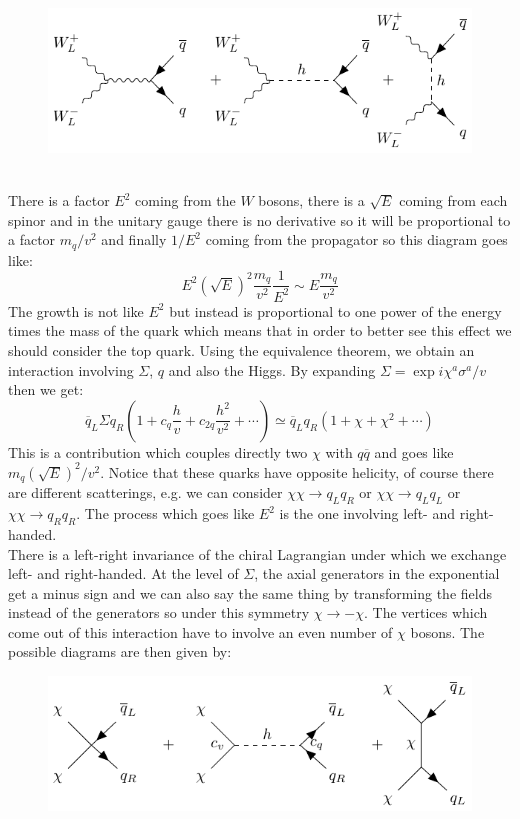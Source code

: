 \documentclass[../main.tex]{subfiles}
\begin{document}
\begin{figure}[h]
    \centering
    \includegraphics{Images/wwqq.pdf}
    \caption*{}
\end{figure}\\
There is a factor $E^2$ coming from the $W$ bosons, there is a $\sqrt{E}$ coming from each spinor and in the unitary gauge there is no derivative so it will be proportional to a factor $m_q/v^2$ and finally $1/E^2$ coming from the propagator so this diagram goes like:
\[
E^2(\sqrt{E})^2\frac{m_q}{v^2}\frac{1}{E^2}\sim E\frac{m_q}{v^2}
\]
The growth is not like $E^2$ but instead is proportional to one power of the energy times the mass of the quark which means that in order to better see this effect we should consider the top quark. Using the equivalence theorem, we obtain an interaction involving $\Sigma$, $q$ and also the Higgs. By expanding $\Sigma=\exp{i\chi^a\sigma^a/v}$ then we get:
\[
\overline{q}_L\Sigma q_R\left(1+c_q\frac{h}{v}+c_{2q}\frac{h^2}{v^2}+\cdots\right)\simeq\overline{q}_Lq_R(1+\chi+\chi^2+\cdots)
\]
This is a contribution which couples directly two $\chi$ with $q\overline{q}$ and goes like $m_q(\sqrt{E})^2/v^2$. Notice that these quarks have opposite helicity, of course there are different scatterings, e.g. we can consider $\chi\chi\to q_Lq_R$ or $\chi\chi\to q_Lq_L$ or $\chi\chi\to q_Rq_R$. The process which goes like $E^2$ is the one involving left- and right-handed.\\
There is a left-right invariance of the chiral Lagrangian under which we exchange left- and right-handed. At the level of $\Sigma$, the axial generators in the exponential get a minus sign and we can also say the same thing by transforming the fields instead of the generators so under this symmetry $\chi\to-\chi$. The vertices which come out of this interaction have to involve an even number of $\chi$ bosons. The possible diagrams are then given by:
\begin{figure}[h]
    \centering
    \includegraphics{Images/chichiqq.pdf}
    \caption*{}
\end{figure}\\
\end{document}
